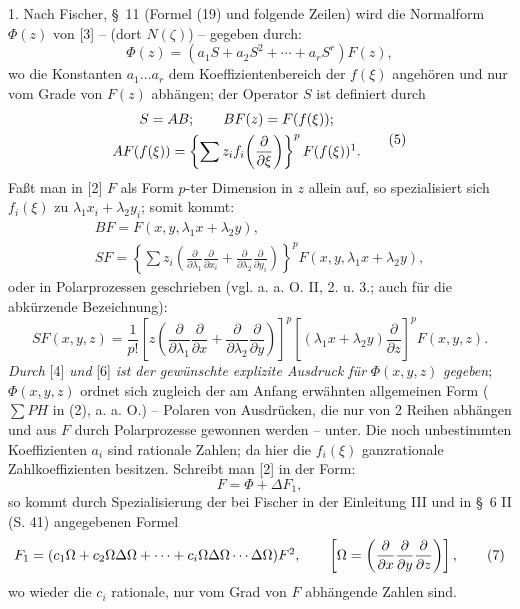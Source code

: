 \documentclass[11pt]{article}
\providecommand{\p}{\partial}
\providecommand{\p}{\partial}
\begin{document}
1. Nach Fischer, \S~11 (Formel (19) und folgende Zeilen) wird die Normalform $\Phi(z)$ von [3] -- (dort $N(\zeta)$) -- gegeben durch:
\begin{equation}
        \Phi(z)=(a_1S+a_2S^2+\cdots+a_rS^r)F(z),
\tag{4}
\end{equation}
wo die Konstanten $a_1\ldots a_r$ dem Koeffizientenbereich der $f(\xi)$ angehören und nur vom Grade von $F(z)$ abhängen; der Operator $S$ ist definiert durch
\begin{equation}
\begin{gathered}
        S=AB;\qquad BF(z)=F(f(\xi));\\
        AF(f(\xi))=\left\{\sum z_i f_i\!\left(\frac{\p}{\p\xi}\right)\right\}^{p}F(f(\xi))\footnotemark.
\end{gathered}
\tag{5}
\end{equation}
Faßt man in [2] $F$ als Form $p$-ter Dimension in $z$ allein auf, so spezialisiert sich $f_i(\xi)$ zu $\lambda_1x_i+\lambda_2y_i$; somit kommt:
\[
\begin{gathered}
        BF=F(x,y,\lambda_1x+\lambda_2y),\\
        SF=\left\{\sum z_i\left(\frac{\p}{\p\lambda_1}\frac{\p}{\p x_i}+
        \frac{\p}{\p\lambda_2}\frac{\p}{\p y_i}\right)\right\}^{p}
        F(x,y,\lambda_1x+\lambda_2y),
\end{gathered}
\]
oder in Polarprozessen geschrieben (vgl. a. a. O. II, 2. u. 3.; auch für die abkürzende Bezeichnung):
\begin{equation}
        SF(x,y,z)=\frac1{p!}\left[z\left(\frac{\p}{\p\lambda_1}\frac{\p}{\p x}+
        \frac{\p}{\p\lambda_2}\frac{\p}{\p y}\right)\right]^p
        \left[(\lambda_1x+\lambda_2y)\frac{\p}{\p z}\right]^p F(x,y,z).
\tag{6}
\end{equation}
\emph{Durch} [4] \emph{und} [6] \emph{ist der gewünschte explizite Ausdruck für} $\Phi(x,y,z)$ \emph{gegeben}; $\Phi(x,y,z)$ ordnet sich zugleich der am Anfang erwähnten allgemeinen Form ($\sum PH$ in (2), a. a. O.) -- Polaren von Ausdrücken, die nur von 2 Reihen abhängen und aus $F$ durch Polarprozesse gewonnen werden -- unter. Die noch unbestimmten Koeffizienten $a_i$ sind rationale Zahlen; da hier die $f_i(\xi)$ ganzrationale Zahlkoeffizienten besitzen. Schreibt man [2] in der Form:
\begin{equation}
        F=\Phi+\Delta F_1,
\tag{2a}
\end{equation}
so kommt durch Spezialisierung der bei Fischer in der Einleitung III und in \S~6 II (S. 41) angegebenen Formel
\begin{equation}
        F_1=(c_1\Omega+c_2\Omega\Delta\Omega+\cdots+c_i\Omega\Delta\Omega\cdots\Delta\Omega)F\footnotemark,
        \qquad \left[\Omega=\left(\frac{\p}{\p x}\frac{\p}{\p y}\frac{\p}{\p z}\right)\right],
\tag{7}
\end{equation}
wo wieder die $c_i$ rationale, nur vom Grad von $F$ abhängende Zahlen sind.
\end{document}
